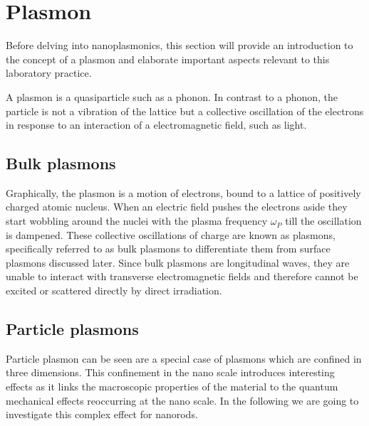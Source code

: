 \section{Plasmon}
\label{sec:TheoPlas}

Before delving into nanoplasmonics, this section will provide an introduction to the concept of a plasmon
and elaborate important aspects relevant to this laboratory practice.

A plasmon is a quasiparticle such as a phonon. In contrast to a phonon, the particle is not a vibration of 
the lattice but a collective oscillation of the electrons in response to an interaction of a electromagnetic field, such as light. 

\subsection*{Bulk plasmons}

Graphically, the plasmon is a motion of electrons, bound to a lattice of positively charged atomic nucleus. When an electric field pushes the 
electrons aside they start wobbling around the nuclei with the plasma frequency $\omega_P$ till the oscillation is dampened. 
These collective oscillations of charge are known as plasmons, specifically referred to as bulk plasmons to differentiate them from surface plasmons discussed later. Since bulk plasmons are longitudinal waves, they are unable to interact with transverse electromagnetic fields and therefore cannot be excited or scattered directly by direct irradiation.

\subsection{Particle plasmons}

Particle plasmon can be seen are a special case of plasmons which are confined in three dimensions. This 
confinement in the nano scale introduces interesting effects as it links the macroscopic properties of the 
material to the quantum mechanical effects reoccurring at the nano scale. In the following we are going to 
investigate this complex effect for nanorods. 


